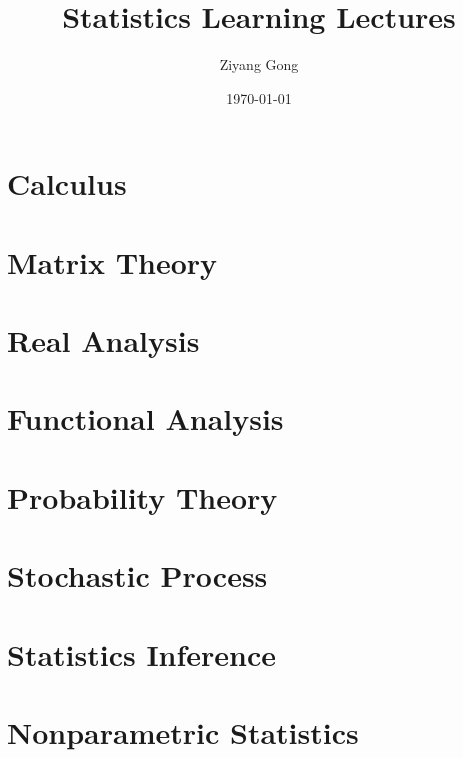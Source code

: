 \documentclass[12pt]{prettybook}
\title{Statistics Learning Lectures}
\author{Ziyang Gong}
\date{\today}
\begin{document}
\frontmatter
\tableofcontents

\mainmatter
\part{Calculus}



\part{Matrix Theory}


\part{Real Analysis}


\part{Functional Analysis}
\part{Probability Theory}






\part{Stochastic Process}




\part{Statistics Inference}





\part{Nonparametric Statistics}

\end{document}
